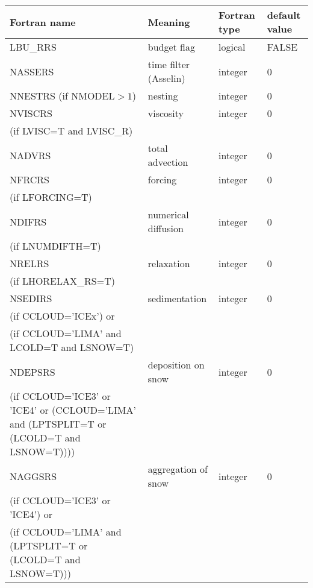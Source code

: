 \begin{longtable} {|p{}|p{}|>{\centering}p{}|p{}<{\centering}|}
\hline
Fortran name & Meaning & Fortran type & default value \\
\hline \hline
\endhead
LBU\_RRS & budget flag & logical & FALSE\index{LBU\_RRS!\innam{NAM\_BU\_RRS}} \\\hline
NASSERS  & time filter (Asselin)   & integer  &  0 \index{NASSERS!\innam{NAM\_BU\_RRS}} \\\hline
NNESTRS (if NMODEL$>1$) & nesting           & integer  &  0 \index{NNESTRS!\innam{NAM\_BU\_RRS}} \\\hline
NVISCRS  & viscosity         & integer  &  0 \index{NVISCRS!\innam{NAM\_BU\_RRS}}\\
(if LVISC=T and LVISC\_R) &  &   &   \\\hline
NADVRS   & total advection   & integer  &  0 \index{NADVRS!\innam{NAM\_BU\_RRS}}\\\hline
NFRCRS   & forcing           & integer  &  0 \index{NFRCRS!\innam{NAM\_BU\_RRS}} \\ \nopagebreak
(if LFORCING=T) &  &   &   \\\hline
NDIFRS   & numerical diffusion & integer  &  0 \index{NDIFRS!\innam{NAM\_BU\_RRS}} \\ \nopagebreak
(if LNUMDIFTH=T) &  &   &   \\\hline
NRELRS   & relaxation        & integer  &  0 \index{NRELRS!\innam{NAM\_BU\_RRS}}\\ \nopagebreak
(if LHORELAX\_RS=T) &  &   &   \\\hline
NSEDIRS  & sedimentation & integer  &  0 \index{NSEDIRS!\innam{NAM\_BU\_RRS}}\\ \nopagebreak
(if CCLOUD='ICEx') or & &   &  \\ \nopagebreak
(if CCLOUD='LIMA' and LCOLD=T and LSNOW=T) & &   &  \\\hline
NDEPSRS  & deposition on snow & integer  &  0 \index{NDEPSRS!\innam{NAM\_BU\_RRS}}\\ \nopagebreak
(if CCLOUD='ICE3' or 'ICE4' or (CCLOUD='LIMA' and (LPTSPLIT=T or (LCOLD=T and LSNOW=T)))) & &   &  \\\hline
NAGGSRS  & aggregation of snow    & integer  &  0 \index{NAGGSRS!\innam{NAM\_BU\_RRS}}\\ \nopagebreak
(if CCLOUD='ICE3' or 'ICE4') or & &   &  \\ \nopagebreak
(if CCLOUD='LIMA' and (LPTSPLIT=T or (LCOLD=T and LSNOW=T))) & &   &  \\\hline

\end{longtable}
